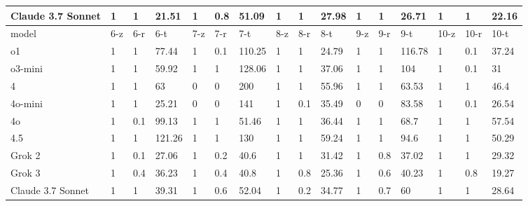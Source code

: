 \documentclass[czech,11pt,a4paper]{article}
\begin{document}
\begin{table}[H]
{\begin{tabular}{l|lll|lll|lll|lll|lll}
					Claude 3.7 Sonnet &           1 &              1 &  21.51 &           1 &            0.8 &  51.09 &           1 &              1 &  27.98 &           1 &              1 &  26.71 &           1 &              1 &  22.16 \\ \hline 
					model &  6-z &  6-r &    6-t &  7-z &  7-r &    7-t &  8-z &  8-r &    8-t &  9-z &  9-r &    9-t & 10-z & 10-r &   10-t \\ \hline
					o1 &           1 &              1 &  77.44 &           1 &            0.1 & 110.25 &           1 &              1 &  24.79 &           1 &              1 & 116.78 &           1 &            0.1 &  37.24 \\
					o3-mini &           1 &              1 &  59.92 &           1 &              1 & 128.06 &           1 &              1 &  37.06 &           1 &              1 &    104 &           1 &            0.1 &     31 \\
					4 &           1 &              1 &     63 &           0 &              0 &    200 &           1 &              1 &  55.96 &           1 &              1 &  63.53 &           1 &              1 &   46.4 \\
					4o-mini &           1 &              1 &  25.21 &           0 &              0 &    141 &           1 &            0.1 &  35.49 &           0 &              0 &  83.58 &           1 &            0.1 &  26.54 \\
					4o  &           1 &            0.1 &  99.13 &           1 &              1 &  51.46 &           1 &              1 &  36.44 &           1 &              1 &   68.7 &           1 &              1 &  57.54 \\
					4.5 &           1 &              1 & 121.26 &           1 &              1 &    130 &           1 &              1 &  59.24 &           1 &              1 &   94.6 &           1 &              1 &  50.29 \\
					Grok 2 &           1 &            0.1 &  27.06 &           1 &            0.2 &   40.6 &           1 &              1 &  31.42 &           1 &            0.8 &  37.02 &           1 &              1 &  29.32 \\
					Grok 3 &           1 &            0.4 &  36.23 &           1 &            0.4 &   40.8 &           1 &            0.8 &  25.36 &           1 &            0.6 &  40.23 &           1 &            0.8 &  19.27 \\
					Claude 3.7 Sonnet &           1 &              1 &  39.31 &           1 &            0.6 &  52.04 &           1 &            0.2 &  34.77 &           1 &            0.7 &     60 &           1 &              1 &  28.64 \\ \hline 

\end{tabular}}
\end{table}
\end{document}
